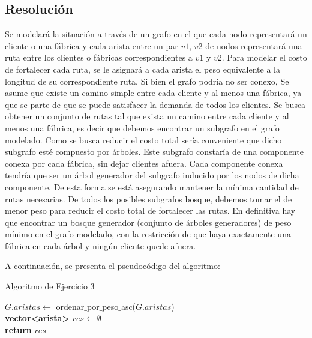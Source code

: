 \subsection{Resolución}
\par{Se modelará la situación a través de un grafo en el que cada nodo
representará un cliente o una fábrica y cada arista entre un par $v1$, $v2$
de nodos representará una ruta entre los clientes o fábricas correspondientes a
$v1$ y $v2$. Para modelar el costo de fortalecer cada ruta, se le asignará a
cada arista el peso equivalente a la longitud de su correspondiente ruta. Si
bien el grafo podría no ser conexo, Se asume que existe un camino simple entre
cada cliente y al menos una fábrica, ya que se parte de que se puede satisfacer
la demanda de todos los clientes. Se busca obtener un conjunto de rutas tal que
exista un camino entre cada cliente y al menos una fábrica, es decir que
debemos encontrar un subgrafo en el grafo modelado. Como se busca reducir el
costo total sería conveniente que dicho subgrafo esté compuesto por árboles.
Este subgrafo constaría de una componente conexa por cada fábrica, sin dejar
clientes afuera. Cada componente conexa tendría que ser un árbol generador
del subgrafo inducido por los nodos de dicha componente. De esta forma se está
asegurando mantener la mínima cantidad de rutas necesarias. De todos los
posibles subgrafos bosque, debemos tomar el de menor peso para reducir el costo
total de fortalecer las rutas. En definitiva hay que encontrar un bosque
generador (conjunto de árboles generadores) de peso mínimo en el grafo modelado,
con la restricción de que haya exactamente una fábrica en cada árbol y ningún
cliente quede afuera.

A continuación, se presenta el pseudocódigo del algoritmo:\\

\begin{algorithm}[H]
	\caption{Algoritmo de Ejercicio 3}
	
	$G.aristas \longleftarrow$ ordenar$\_$por$\_$peso$\_$asc($G.aristas$)\\
	\textbf{vector<arista>} $res \longleftarrow \emptyset$\\
	\textbf{return} $res$\\
	
\end{algorithm}

}

